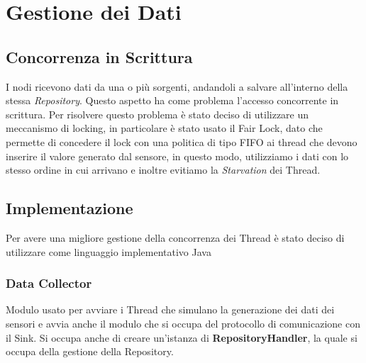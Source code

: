 \chapter{Gestione dei Dati}
  \section{Concorrenza in Scrittura}
    I nodi ricevono dati da una o più sorgenti, andandoli a salvare all'interno della stessa \textit{Repository}. Questo aspetto ha come problema l'accesso concorrente in scrittura.\newline
    Per risolvere questo problema è stato deciso di utilizzare un meccanismo di locking, in particolare è stato usato il Fair Lock, dato che permette di concedere il lock con una politica di tipo FIFO ai thread che devono inserire il valore generato dal sensore, in questo modo, utilizziamo i dati con lo stesso ordine in cui arrivano e inoltre evitiamo la \textit{Starvation} dei Thread.

  \section{Implementazione}
    Per avere una migliore gestione della concorrenza dei Thread è stato deciso di utilizzare come linguaggio implementativo Java
    \subsection{Data Collector}
      Modulo usato per avviare i Thread che simulano la generazione dei dati dei sensori e avvia anche il modulo che si occupa del protocollo di comunicazione con il Sink. Si occupa anche di creare un'istanza di \textbf{RepositoryHandler}, la quale si occupa della gestione della Repository.
      

